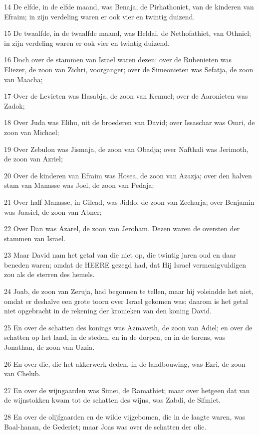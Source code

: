 \par 14 De elfde, in de elfde maand, was Benaja, de Pirhathoniet, van de kinderen van Efraim; in zijn verdeling waren er ook vier en twintig duizend.
\par 15 De twaalfde, in de twaalfde maand, was Heldai, de Nethofathiet, van Othniel; in zijn verdeling waren er ook vier en twintig duizend.
\par 16 Doch over de stammen van Israel waren dezen: over de Rubenieten was Eliezer, de zoon van Zichri, voorganger; over de Simeonieten was Sefatja, de zoon van Maacha;
\par 17 Over de Levieten was Hasabja, de zoon van Kemuel; over de Aaronieten was Zadok;
\par 18 Over Juda was Elihu, uit de broederen van David; over Issaschar was Omri, de zoon van Michael;
\par 19 Over Zebulon was Jismaja, de zoon van Obadja; over Nafthali was Jerimoth, de zoon van Azriel;
\par 20 Over de kinderen van Efraim was Hosea, de zoon van Azazja; over den halven stam van Manasse was Joel, de zoon van Pedaja;
\par 21 Over half Manasse, in Gilead, was Jiddo, de zoon van Zecharja; over Benjamin was Jaasiel, de zoon van Abner;
\par 22 Over Dan was Azarel, de zoon van Jeroham. Dezen waren de oversten der stammen van Israel.
\par 23 Maar David nam het getal van die niet op, die twintig jaren oud en daar beneden waren; omdat de HEERE gezegd had, dat Hij Israel vermenigvuldigen zou als de sterren des hemels.
\par 24 Joab, de zoon van Zeruja, had begonnen te tellen, maar hij voleindde het niet, omdat er deshalve een grote toorn over Israel gekomen was; daarom is het getal niet opgebracht in de rekening der kronieken van den koning David.
\par 25 En over de schatten des konings was Azmaveth, de zoon van Adiel; en over de schatten op het land, in de steden, en in de dorpen, en in de torens, was Jonathan, de zoon van Uzzia.
\par 26 En over die, die het akkerwerk deden, in de landbouwing, was Ezri, de zoon van Chelub.
\par 27 En over de wijngaarden was Simei, de Ramathiet; maar over hetgeen dat van de wijnstokken kwam tot de schatten des wijns, was Zabdi, de Sifmiet.
\par 28 En over de olijfgaarden en de wilde vijgebomen, die in de laagte waren, was Baal-hanan, de Gederiet; maar Joas was over de schatten der olie.
